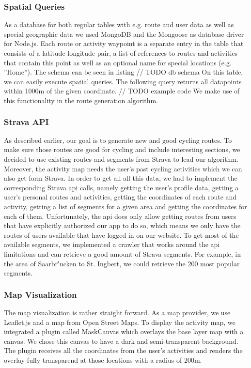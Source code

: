 \documentclass{sigchi}
\begin{document}
\subsubsection{Spatial Queries}
As a database for both regular tables with e.g. route and user data as well as special geographic data we used MongoDB and the Mongoose as database driver for Node.js. Each route or activity waypoint is a separate entry in the table that consists of a latitude-longitude-pair, a list of references to routes and activities that contain this point as well as an optional name for special locations (e.g. ''Home''). The schema can be seen in listing // TODO db schema
On this table, we can easily execute spatial queries. The following query returns all datapoints within 1000m of the given coordinate. // TODO example code
We make use of this functionality in the route generation algorithm.
\subsubsection{Strava API}
As described earlier, our goal is to generate new and good cycling routes. To make sure those routes are good for cycling and include interesting sections, we decided to use existing routes and segments from Strava to lead our algorithm. Moreover, the activity map needs the user's past cycling activities which we can also get form Strava. In order to get all all this data, we had to implement the corresponding Strava api calls, namely getting the user's profile data, getting a user's personal routes and activities, getting the coordinates of each route and activity, getting a list of segments for a given area and getting the coordinates for each of them. Unfortunately, the api does only allow getting routes from users that have explicitly authorized our app to do so, which means we only have the routes of users available that have logged in on our website. To get most of the available segments, we implemented a crawler that works around the api limitations and can retrieve a good amount of Strava segments. For example, in the area of Saarbr\''ucken to St. Ingbert, we could retrieve the 200 most popular segments.
\subsubsection{Map Visualization}
The map visualization is rather straight forward. As a map provider, we use Leaflet.js and a map from Open Street Maps. To display the activity map, we integrated a plugin called MaskCanvas which overlays the base layer map with a canvas. We chose this canvas to have a dark and semi-transparent background. The plugin receives all the coordinates from the user's activities and renders the overlay fully transparend at those locations with a radius of 200m.
\end{document}
